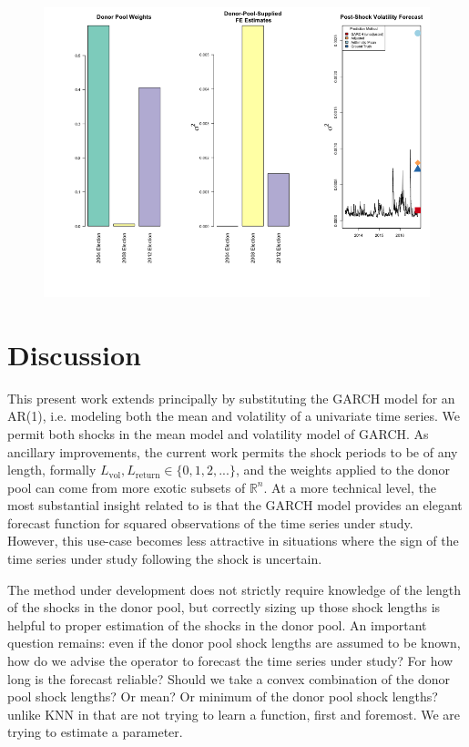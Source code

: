 \documentclass[11pt]{article}
\theoremstyle{definition}
\begin{document}
\begin{figure}[H]
\begin{center}
  \includegraphics[scale=.6]{real_data_output_plots/savetime_SatMay112045002024_IYG_CL=F-^VIX-^IRX-^FVX-^TNX-^TYX_^VIX_2016-11-08-2004-11-02-2008-11-04-2012-11-06}
  \label{fig:SVF_2016_without_Brexit}
  \end{center}
\end{figure}


\section{Discussion}

This present work extends \citet{lin2021minimizing} principally by substituting the GARCH model for an AR(1), i.e. modeling both the mean and volatility of a univariate time series.  We permit both shocks in the mean model and volatility model of GARCH.  As ancillary improvements, the current work permits the shock periods to be of any length, formally $L_{\text{vol}}, L_{\text{return}} \in\{0,1,2,...\}$, and the weights applied to the donor pool can come from more exotic subsets of $\mathbb{R}^{n}$.  At a more technical level, the most substantial insight related to \citet{lin2021minimizing} is that the GARCH model provides an elegant forecast function for squared observations of the time series under study. However, this use-case becomes less attractive in situations where the sign of the time series under study following the shock is uncertain.

The method under development does not strictly require knowledge of the length of the shocks in the donor pool, but correctly sizing up those shock lengths is helpful to proper estimation of the shocks in the donor pool.  An important question remains: even if the donor pool shock lengths are assumed to be known, how do we advise the operator to forecast the time series under study?  For how long is the forecast reliable?  Should we take a convex combination of the donor pool shock lengths?  Or mean? Or minimum of the donor pool shock lengths?
unlike KNN in that are not trying to learn a function, first and foremost.  We are trying to estimate a parameter.
\end{document}
